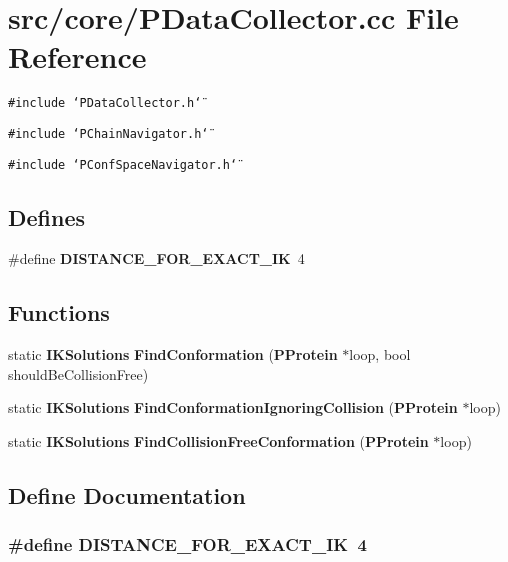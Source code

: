 \section{src/core/PData\-Collector.cc File Reference}
\label{PDataCollector_8cc}


{\tt \#include \char`\"{}PData\-Collector.h\char`\"{}}\par
{\tt \#include \char`\"{}PChain\-Navigator.h\char`\"{}}\par
{\tt \#include \char`\"{}PConf\-Space\-Navigator.h\char`\"{}}\par
\subsection*{Defines}
\begin{CompactItemize}
\item 
\#define {\bf DISTANCE\_\-FOR\_\-EXACT\_\-IK}~4
\end{CompactItemize}
\subsection*{Functions}
\begin{CompactItemize}
\item 
static {\bf IKSolutions} {\bf Find\-Conformation} ({\bf PProtein} $\ast$loop, bool should\-Be\-Collision\-Free)
\item 
static {\bf IKSolutions} {\bf Find\-Conformation\-Ignoring\-Collision} ({\bf PProtein} $\ast$loop)
\item 
static {\bf IKSolutions} {\bf Find\-Collision\-Free\-Conformation} ({\bf PProtein} $\ast$loop)
\end{CompactItemize}


\subsection{Define Documentation}
\subsubsection{\setlength{\rightskip}{0pt plus 5cm}\#define DISTANCE\_\-FOR\_\-EXACT\_\-IK~4}\label{PDataCollector_8cc_1be359e0e253ca3610a47eea19aa3e69}





